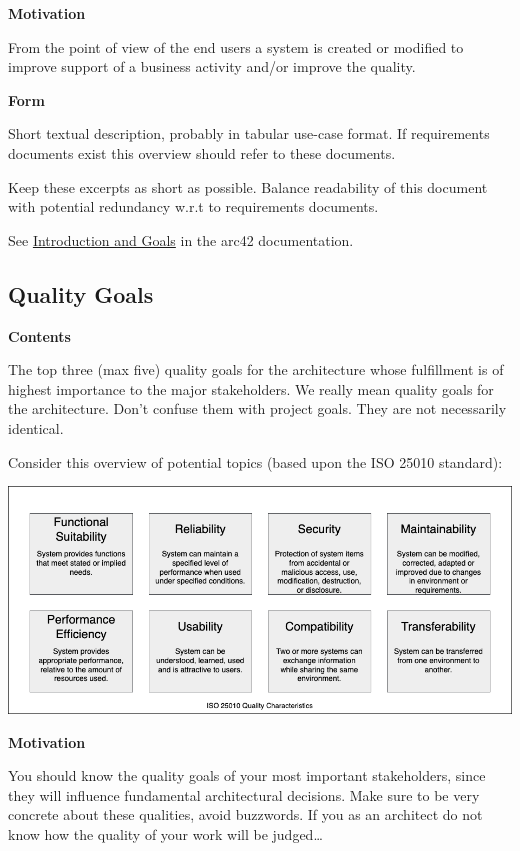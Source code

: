 \documentclass[
]{article}
\begin{document}
\textbf{Motivation}

From the point of view of the end users a system is created or modified
to improve support of a business activity and/or improve the quality.

\textbf{Form}

Short textual description, probably in tabular use-case format. If
requirements documents exist this overview should refer to these
documents.

Keep these excerpts as short as possible. Balance readability of this
document with potential redundancy w.r.t to requirements documents.

See \href{https://docs.arc42.org/section-1/}{Introduction and Goals} in
the arc42 documentation.

\hypertarget{_quality_goals}{%
\subsection{Quality Goals}\label{_quality_goals}}

\textbf{Contents}

The top three (max five) quality goals for the architecture whose
fulfillment is of highest importance to the major stakeholders. We
really mean quality goals for the architecture. Don't confuse them with
project goals. They are not necessarily identical.

Consider this overview of potential topics (based upon the ISO 25010
standard):

\includegraphics{images/01_2_iso-25010-topics-EN.drawio.png}

\textbf{Motivation}

You should know the quality goals of your most important stakeholders,
since they will influence fundamental architectural decisions. Make sure
to be very concrete about these qualities, avoid buzzwords. If you as an
architect do not know how the quality of your work will be
judged\ldots{}
\end{document}
